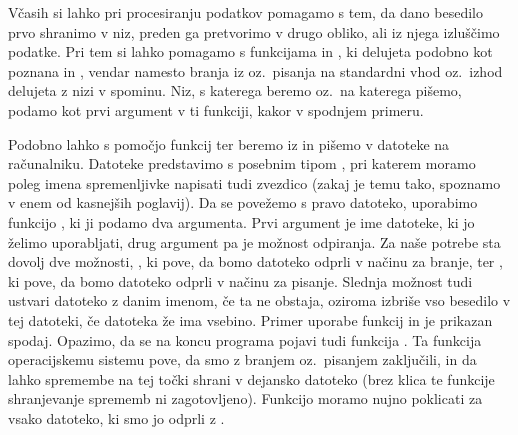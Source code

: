 
Včasih si lahko pri procesiranju podatkov pomagamo s tem, da dano besedilo prvo
shranimo v niz, preden ga pretvorimo v drugo obliko, ali iz njega izluščimo
podatke.
Pri tem si lahko pomagamo s funkcijama  in , ki
delujeta podobno kot poznana  in , vendar namesto
branja iz oz.~pisanja na standardni vhod oz.~izhod delujeta z nizi v spominu.
Niz, s katerega beremo oz.~na katerega pišemo, podamo kot prvi argument v ti
funkciji, kakor v spodnjem primeru.


Podobno lahko s pomočjo funkcij  ter  beremo iz in
pišemo v datoteke na računalniku.
Datoteke predstavimo s posebnim tipom , pri katerem moramo poleg
imena spremenljivke napisati tudi zvezdico (zakaj je temu tako, spoznamo v enem
od kasnejših poglavij).
Da se povežemo s pravo datoteko, uporabimo funkcijo , ki ji podamo
dva argumenta.
Prvi argument je ime datoteke, ki jo želimo uporabljati, drug argument pa je
možnost odpiranja.
Za naše potrebe sta dovolj dve možnosti, , ki pove, da bomo datoteko
odprli v načinu za branje, ter , ki pove, da bomo datoteko odprli v
načinu za pisanje.
Slednja možnost tudi ustvari datoteko z danim imenom, če ta ne obstaja, oziroma
izbriše vso besedilo v tej datoteki, če datoteka že ima vsebino.
Primer uporabe funkcij  in  je prikazan spodaj.
Opazimo, da se na koncu programa pojavi tudi funkcija .
Ta funkcija operacijskemu sistemu pove, da smo z branjem oz.~pisanjem
zaključili, in da lahko spremembe na tej točki shrani v dejansko datoteko (brez
klica te funkcije shranjevanje sprememb ni zagotovljeno).
Funkcijo moramo nujno poklicati za vsako datoteko, ki smo jo odprli z
.




